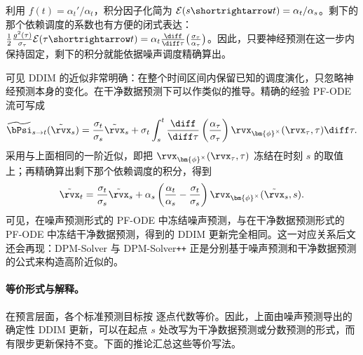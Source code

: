利用 $f(t)=\alpha_t'/\alpha_t$，积分因子化简为 $\mathcal E(s\shortrightarrow t)=\alpha_t/\alpha_s$。剩下的那个依赖调度的系数也有方便的闭式表达：
$\tfrac{1}{2}\tfrac{g^2(\tau)}{\sigma_\tau}
\mathcal E(\tau\shortrightarrow t)
=
\alpha_t
\tfrac{\diff}{\diff\tau}
\bigl(\tfrac{\sigma_\tau}{\alpha_\tau}\bigr)$。因此，只要神经预测在这一步内保持固定，剩下的积分就能依据噪声调度精确算出。


可见 DDIM 的近似非常明确：在整个时间区间内保留已知的调度演化，只忽略神经预测本身的变化。在干净数据预测下可以作类似的推导。精确的经验 PF-ODE 流可写成
\begin{align*}
\widetilde\bPsi_{s\to t}(\tilde\rvx_s)
=
\frac{\sigma_t}{\sigma_s}\tilde\rvx_s
+
\sigma_t
\int_s^t
\frac{\diff}{\diff\tau}
\left(
\frac{\alpha_\tau}{\sigma_\tau}
\right)
\rvx_{\bm{\phi}^\times}(\rvx_\tau,\tau)
\diff\tau.
\end{align*}
采用与上面相同的一阶近似，即把 $\rvx_{\bm{\phi}^\times}(\rvx_\tau,\tau)$ 冻结在时刻 $s$ 的取值上；再精确算出剩下那个依赖调度的积分，得到
\[
\tilde\rvx_t
=
\frac{\sigma_t}{\sigma_s}\tilde\rvx_s
+
\alpha_s
\left(
\frac{\alpha_t}{\alpha_s}
-
\frac{\sigma_t}{\sigma_s}
\right)
\rvx_{\bm{\phi}^\times}(\tilde\rvx_s,s).
\]
可见，在噪声预测形式的 PF-ODE 中冻结噪声预测，与在干净数据预测形式的 PF-ODE 中冻结干净数据预测，得到的 DDIM 更新完全相同。这一对应关系后文还会再现：DPM-Solver 与 DPM-Solver\texttt{++} 正是分别基于噪声预测和干净数据预测的公式来构造高阶近似的。

\paragraph{等价形式与解释。}
在预言层面，各个标准预测目标按  逐点代数等价。因此，上面由噪声预测导出的确定性 DDIM 更新，可以在起点 $s$ 处改写为干净数据预测或分数预测的形式，而有限步更新保持不变。下面的推论汇总这些等价写法。

